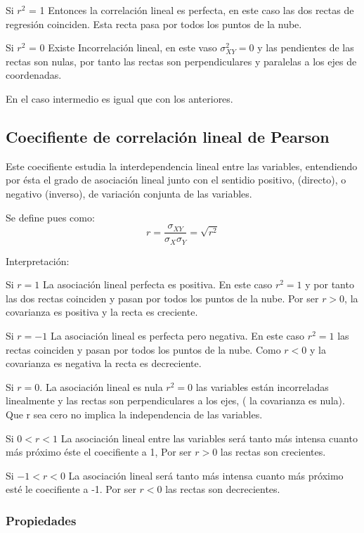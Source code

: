 \documentclass{article}
\begin{document}
Si $r^2$ = 1 Entonces la correlación lineal es perfecta, en este caso las dos rectas de regresión coinciden. Esta recta pasa por todos los puntos de la nube.

Si $r^2$ = 0 Existe Incorrelación lineal, en este vaso $\sigma_{XY}^2 = 0$ y las pendientes de las rectas son nulas, por tanto las rectas son perpendiculares y paralelas a los ejes de coordenadas.

En el caso intermedio es igual que con los anteriores.

\subsection{Coecifiente de correlación lineal de Pearson}

Este coecifiente estudia la interdependencia lineal entre las variables, entendiendo por ésta el grado de asociación lineal junto con el sentidio positivo, (directo), o negativo (inverso), de variación conjunta de las variables.

Se define pues como:
$$ r = \frac{\sigma_{XY}}{\sigma_{X} \sigma_{Y}}  = \sqrt{r^2}$$

Interpretación:

Si $r = 1$ La asociación lineal perfecta es positiva. En este caso $r^2 = 1$ y por tanto las dos rectas coinciden y pasan por todos los puntos de la nube. Por ser $r > 0$, la covarianza es positiva y la recta es creciente.

Si $r= -1$ La asociación lineal es perfecta pero negativa. En este caso $r^2 = 1$ las rectas coinciden y pasan por todos los puntos de la nube. Como $r < 0$ y la covarianza es negativa la recta es decreciente.


Si $r = 0$. La asociación lineal es nula $r^2 = 0$ las variables están incorreladas linealmente y las rectas son perpendiculares a los ejes, ( la covarianza es nula).  Que r sea cero no implica la independencia de las variables.

Si $ 0 < r < 1 $ La asociación lineal entre las variables será tanto más intensa cuanto más próximo éste el coecifiente a 1, Por ser $ r > 0 $ las rectas son crecientes.

Si $ -1 < r < 0 $ La asociación lineal será tanto más intensa cuanto más próximo esté le coecifiente a -1. Por ser $ r < 0$ las rectas son decrecientes.

\subsubsection{Propiedades}
\end{document}
